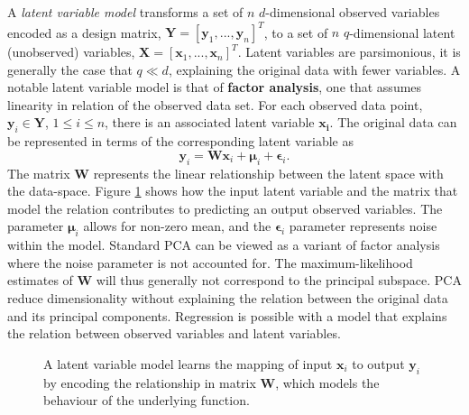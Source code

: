 \documentclass[ %
author={Dillon Keith Diep},
supervisor={Dr. Carl Henrik Ek},
degree={MEng},
title={ART-CG Hair:},
subtitle={Assisted Real-time Content Generation of Stylised Virtual Hair},
type={Research},
year={2017} ]{dissertation}
\begin{document}
A \textit{latent variable model} transforms a set of $n$ $d$-dimensional observed variables encoded as a design matrix, $\bm{Y}=[\bm{y}_1,...,\bm{y}_n]^T$, to a set of $n$ $q$-dimensional latent (unobserved) variables, $\bm{X}=[\bm{x}_1,...,\bm{x}_n]^T$. Latent variables are parsimonious, it is generally the case that $q \ll d$, explaining the original data with fewer variables. A notable latent variable model is that of \textbf{factor analysis}, one that assumes linearity in relation of the observed data set.
For each observed data point, $\bm{y}_i \in \bm{Y}$, $1 \leq i \leq n $, there is an associated latent variable $\bm{x_i}$. The original data can be represented in terms of the corresponding latent variable as
\begin{equation} \label{ppca:fa}
\bm{y}_i=\bm{Wx}_i+\bm{\mu}_i+\bm{\epsilon}_i.
\end{equation}
The matrix $\bm{W}$ represents the linear relationship between the latent space with the data-space. Figure \ref{lvm} shows how the input latent variable and the matrix that model the relation contributes to predicting an output observed variables.
The parameter $\bm{\mu}_i$ allows for non-zero mean, and the $\bm{\epsilon}_i$ parameter represents noise within the model. Standard PCA can be viewed as a variant of factor analysis where the noise parameter is not accounted for. The maximum-likelihood estimates of $\bm{W}$ will thus generally not correspond to the principal subspace. PCA reduce dimensionality without explaining the relation between the original data and its principal components. Regression is possible with a model that explains the relation between observed variables and latent variables.

\begin{figure}[!h]
	\centering
	\caption{A latent variable model learns the mapping of input $\bm{x}_i$ to output $\bm{y}_i$ by encoding the relationship in matrix $\bm{W}$, which models the behaviour of the underlying function.}
	\vspace{0.1cm}
	\label{lvm}
\end{figure} 
\end{document}
